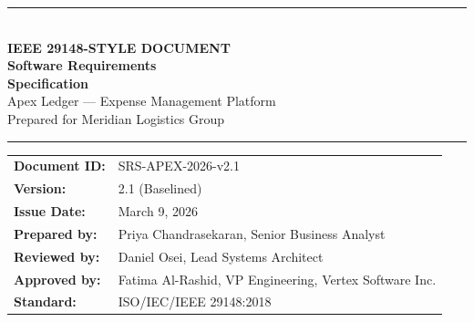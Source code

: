 \begin{titlepage}
\thispagestyle{empty}


\vspace*{2.6cm}
\begin{center}
  {\color{rulegray}\rule{0.5\textwidth}{0.5pt}}\\[0.35cm]
  {\Large\color{steelblue}\bfseries IEEE 29148-STYLE DOCUMENT}\\[0.9cm]
  {\fontsize{28}{32}\selectfont\bfseries\color{navydark} Software Requirements\\[0.15em] Specification}\\[0.6cm]
  {\Large\color{steelblue} Apex Ledger --- Expense Management Platform}\\[0.25cm]
  {\large\color{rulegray} Prepared for Meridian Logistics Group}\\[1.0cm]
  {\color{rulegray}\rule{0.5\textwidth}{0.5pt}}
\end{center}

\vspace{1.0cm}

\begin{center}
\begin{tabularx}{0.85\textwidth}{@{}Xl@{}}
  \textbf{\color{navydark}Document ID:} & SRS-APEX-2026-v2.1 \\
  \textbf{\color{navydark}Version:} & 2.1 (Baselined) \\
  \textbf{\color{navydark}Issue Date:} & March 9, 2026 \\
  \textbf{\color{navydark}Prepared by:} & Priya Chandrasekaran, Senior Business Analyst \\
  \textbf{\color{navydark}Reviewed by:} & Daniel Osei, Lead Systems Architect \\
  \textbf{\color{navydark}Approved by:} & Fatima Al-Rashid, VP Engineering, Vertex Software Inc. \\
  \textbf{\color{navydark}Standard:} & ISO/IEC/IEEE 29148:2018 \\
\end{tabularx}
\end{center}


\end{titlepage}
